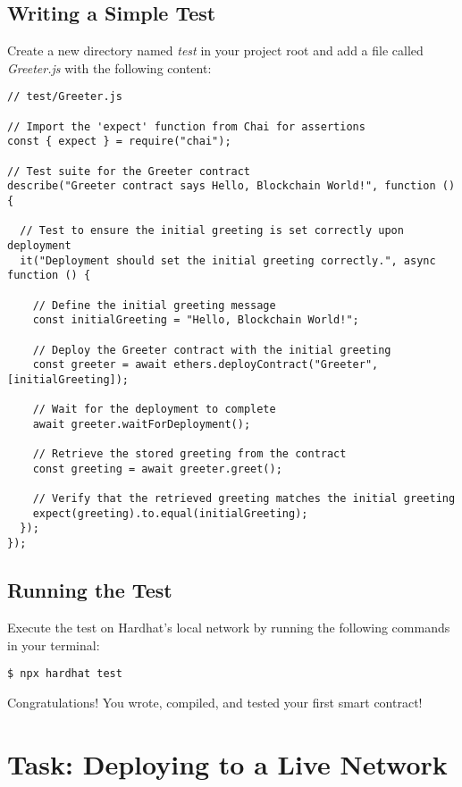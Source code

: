 \documentclass[12pt]{article}
\begin{document}
\subsection{Writing a Simple Test}

Create a new directory named \textit{test} in your project root and add a file called \textit{Greeter.js} with the following content:

\begin{verbatim}
// test/Greeter.js

// Import the 'expect' function from Chai for assertions
const { expect } = require("chai");

// Test suite for the Greeter contract
describe("Greeter contract says Hello, Blockchain World!", function () {
  
  // Test to ensure the initial greeting is set correctly upon deployment
  it("Deployment should set the initial greeting correctly.", async function () {
    
    // Define the initial greeting message
    const initialGreeting = "Hello, Blockchain World!";
    
    // Deploy the Greeter contract with the initial greeting
    const greeter = await ethers.deployContract("Greeter", [initialGreeting]);
    
    // Wait for the deployment to complete
    await greeter.waitForDeployment();

    // Retrieve the stored greeting from the contract
    const greeting = await greeter.greet();

    // Verify that the retrieved greeting matches the initial greeting
    expect(greeting).to.equal(initialGreeting);
  });
});
\end{verbatim}

\subsection{Running the Test}

Execute the test on Hardhat's local network by running the following commands in your terminal:

\begin{verbatim}
$ npx hardhat test
\end{verbatim}
Congratulations! You wrote, compiled, and tested your first smart contract!

\section{Task: Deploying to a Live Network}
\end{document}
